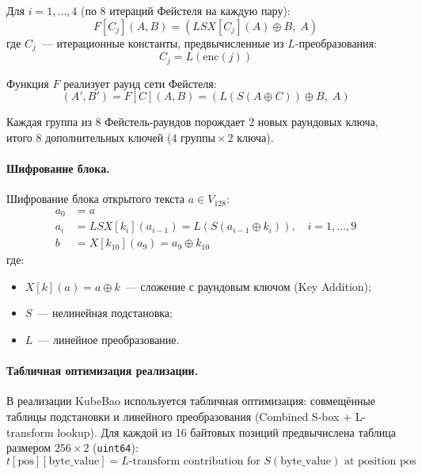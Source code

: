 \documentclass[a4paper,14pt]{extarticle}
\begin{document}
Для $i = 1, \ldots, 4$ (по 8 итераций Фейстеля на каждую пару):
\begin{equation}
    F[C_j](A, B) = (LSX[C_j](A) \oplus B, \; A)
\end{equation}
где $C_j$~--- итерационные константы, предвычисленные из $L$-преобразования:
\begin{equation}
    C_j = L(\mathrm{enc}(j))
\end{equation}

Функция $F$ реализует раунд сети Фейстеля:
\begin{equation}
    (A', B') = F[C](A, B) = (L(S(A \oplus C)) \oplus B, \; A)
\end{equation}

Каждая группа из 8 Фейстель-раундов порождает 2 новых раундовых ключа, итого 8 дополнительных ключей ($4 \text{ группы} \times 2 \text{ ключа}$).

\paragraph{Шифрование блока.}

Шифрование блока открытого текста $a \in V_{128}$:
\begin{align}
    a_0 &= a \\
    a_i &= LSX[k_i](a_{i-1}) = L(S(a_{i-1} \oplus k_i)), \quad i = 1, \ldots, 9 \\
    b &= X[k_{10}](a_9) = a_9 \oplus k_{10}
\end{align}
где:
\begin{itemize}
    \item $X[k](a) = a \oplus k$~--- сложение с раундовым ключом (Key Addition);
    \item $S$~--- нелинейная подстановка;
    \item $L$~--- линейное преобразование.
\end{itemize}

\paragraph{Табличная оптимизация реализации.}

В реализации KubeBao используется табличная оптимизация: совмещённые таблицы подстановки и линейного преобразования (Combined S-box + L-transform lookup). Для каждой из 16 байтовых позиций предвычислена таблица размером $256 \times 2$ (\texttt{uint64}):
\begin{equation}
    t[\mathrm{pos}][\mathrm{byte\_value}] = L\text{-transform contribution for } S(\mathrm{byte\_value}) \text{ at position pos}
\end{equation}
\end{document}
